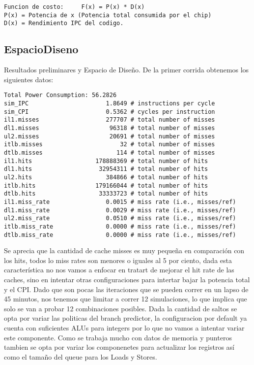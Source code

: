 \documentclass[journal]{IEEEtran}
\begin{document}
\footnotesize \begin{verbatim}
Funcion de costo:     F(x) = P(x) * D(x)
P(x) = Potencia de x (Potencia total consumida por el chip)
D(x) = Rendimiento IPC del codigo.
\end{verbatim}
\normalsize

\subsection{EspacioDiseno}
Resultados preliminares y Espacio de Dise\~no.
De la primer corrida obtenemos los siguientes datos:
\footnotesize \begin{verbatim}
Total Power Consumption: 56.2826
sim_IPC                      1.8649 # instructions per cycle
sim_CPI                      0.5362 # cycles per instruction
il1.misses                   277707 # total number of misses
dl1.misses                    96318 # total number of misses
ul2.misses                    20691 # total number of misses
itlb.misses                      32 # total number of misses
dtlb.misses                     114 # total number of misses
il1.hits                  178888369 # total number of hits
dl1.hits                   32954311 # total number of hits
ul2.hits                     384866 # total number of hits
itlb.hits                 179166044 # total number of hits
dtlb.hits                  33333723 # total number of hits
il1.miss_rate                0.0015 # miss rate (i.e., misses/ref)
dl1.miss_rate                0.0029 # miss rate (i.e., misses/ref)
ul2.miss_rate                0.0510 # miss rate (i.e., misses/ref)
itlb.miss_rate               0.0000 # miss rate (i.e., misses/ref)
dtlb.miss_rate               0.0000 # miss rate (i.e., misses/ref)
\end{verbatim}
\normalsize

Se aprecia que la cantidad de cache misses es muy peque\~na en comparaci\'on con los hits, todos lo miss rates son menores o iguales al 5 por ciento, dada esta caracter\'istica no nos vamos a enfocar en tratart de mejorar el hit rate de las caches, sino en intentar otras configuraciones para intertar bajar la potencia total y el CPI.
Dado que son pocas las iteraciones que se pueden correr en un lapso de 45 minutos, nos tenemos que limitar a correr 12 simulaciones, lo que implica que solo se van a probar 12 combinaciones posibles.  Dada la cantidad de saltos se opta por variar las politicas del branch predictor, la configuracion por default ya cuenta con suficientes ALUs para integers por lo que no vamos a intentar variar este componente.  Como se trabaja mucho con datos de memoria y punteros tambien se opta por variar los componenetes para actualizar los registros as\'i como el tama\~no del queue para los Loads y Stores.
\end{document}
